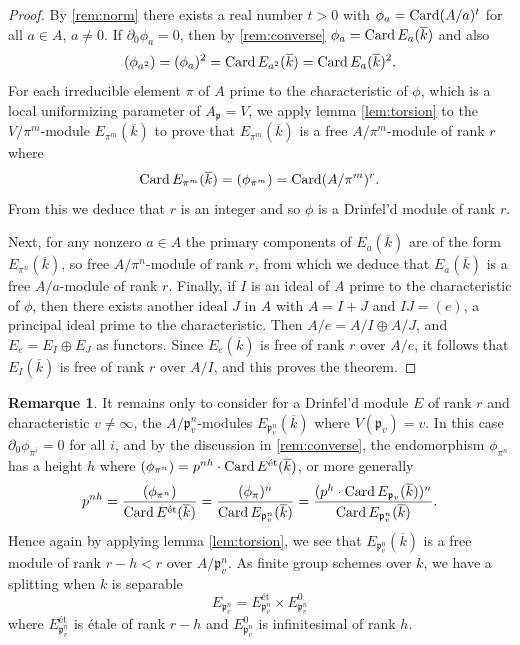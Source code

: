 \documentclass[12pt,a4paper]{article}
\theoremstyle{plain}
\theoremstyle{definition}
\newtheorem{remark}{Remarque}[section]
\theoremstyle{remark}
\DeclareMathOperator{\Card}{Card}
\newcommand{\fp}{\mathfrak{p}}
\let\deg\relax
\providecommand{\fp}{\mathfrak{p}}
\begin{document}
\begin{proof}
By \eqref{rem:norm} there exists a real number $t > 0$ with $\deg \phi_a = \Card(A/a)^t$ for all $a \in A$, $a \neq 0$. If $\partial_0 \phi_a = 0$, then by \eqref{rem:converse} $\deg \phi_a = \Card E_a(\overline{k})$ and also
\[
\deg(\phi_{a^2}) = \deg(\phi_a)^2 = \Card E_{a^2}(\overline{k}) = \Card E_a(\overline{k})^2.
\]
For each irreducible element $\pi$ of $A$ prime to the characteristic of $\phi$, which is a local uniformizing parameter of $A_\fp = V$, we apply lemma \eqref{lem:torsion} to the $V/\pi^m$-module $E_{\pi^m}(\overline{k})$ to prove that $E_{\pi^m}(\overline{k})$ is a free $A/\pi^m$-module of rank $r$ where
\[
\Card E_{\pi^m}(\overline{k}) = \deg(\phi_{\pi^m}) = \Card(A/\pi^m)^r.
\]
From this we deduce that $r$ is an integer and so $\phi$ is a Drinfel'd module of rank $r$.

Next, for any nonzero $a \in A$ the primary components of $E_a(\overline{k})$ are of the form $E_{\pi^n}(\overline{k})$, so free $A/\pi^n$-module of rank $r$, from which we deduce that $E_a(\overline{k})$ is a free $A/a$-module of rank $r$. Finally, if $I$ is an ideal of $A$ prime to the characteristic of $\phi$, then there exists another ideal $J$ in $A$ with $A = I + J$ and $IJ = (e)$, a principal ideal prime to the characteristic. Then $A/e = A/I \oplus A/J$, and $E_e = E_I \oplus E_J$ as functors. Since $E_e(\overline{k})$ is free of rank $r$ over $A/e$, it follows that $E_I(\overline{k})$ is free of rank $r$ over $A/I$, and this proves the theorem.
\end{proof}

\begin{remark}
\label{rem:singular}
It remains only to consider for a Drinfel'd module $E$ of rank $r$ and characteristic $v \neq \infty$, the $A/\fp_v^n$-modules $E_{\fp_v^n}(\overline{k})$ where $V(\fp_v) = v$. In this case $\partial_0 \phi_{\pi^i} = 0$ for all $i$, and by the discussion in \eqref{rem:converse}, the endomorphism $\phi_{\pi^n}$ has a height $h$ where $\deg(\phi_{\pi^n}) = p^{nh} \cdot \Card E^{\text{\'et}}(\overline{k})$, or more generally
\[
p^{nh} = \frac{\deg(\phi_{\pi^n})}{\Card E^{\text{\'et}}(\overline{k})} = \frac{(\deg \phi_\pi)^n}{\Card E_{\fp_v^n}(\overline{k})} = \frac{(p^h \cdot \Card E_{\fp_v}(\overline{k}))^n}{\Card E_{\fp_v^n}(\overline{k})}.
\]
Hence again by applying lemma \eqref{lem:torsion}, we see that $E_{\fp_v^n}(\overline{k})$ is a free module of rank $r - h < r$ over $A/\fp_v^n$. As finite group schemes over $k$, we have a splitting when $k$ is separable
\[
E_{\fp_v^n} = E_{\fp_v^n}^{\text{\'et}} \times E_{\fp_v^n}^0
\]
where $E_{\fp_v^n}^{\text{\'et}}$ is \'etale of rank $r - h$ and $E_{\fp_v^n}^0$ is infinitesimal of rank $h$.
\end{remark}
\end{document}

